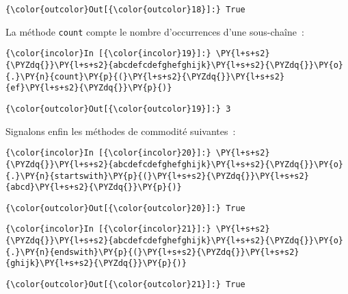 \begin{Verbatim}[commandchars=\\\{\}]
{\color{outcolor}Out[{\color{outcolor}18}]:} True
\end{Verbatim}
            
    La méthode \texttt{count} compte le nombre d'occurrences d'une
sous-chaîne~:

    \begin{Verbatim}[commandchars=\\\{\}]
{\color{incolor}In [{\color{incolor}19}]:} \PY{l+s+s2}{\PYZdq{}}\PY{l+s+s2}{abcdefcdefghefghijk}\PY{l+s+s2}{\PYZdq{}}\PY{o}{.}\PY{n}{count}\PY{p}{(}\PY{l+s+s2}{\PYZdq{}}\PY{l+s+s2}{ef}\PY{l+s+s2}{\PYZdq{}}\PY{p}{)}
\end{Verbatim}


\begin{Verbatim}[commandchars=\\\{\}]
{\color{outcolor}Out[{\color{outcolor}19}]:} 3
\end{Verbatim}
            
    Signalons enfin les méthodes de commodité suivantes~:

    \begin{Verbatim}[commandchars=\\\{\}]
{\color{incolor}In [{\color{incolor}20}]:} \PY{l+s+s2}{\PYZdq{}}\PY{l+s+s2}{abcdefcdefghefghijk}\PY{l+s+s2}{\PYZdq{}}\PY{o}{.}\PY{n}{startswith}\PY{p}{(}\PY{l+s+s2}{\PYZdq{}}\PY{l+s+s2}{abcd}\PY{l+s+s2}{\PYZdq{}}\PY{p}{)}
\end{Verbatim}


\begin{Verbatim}[commandchars=\\\{\}]
{\color{outcolor}Out[{\color{outcolor}20}]:} True
\end{Verbatim}
            
    \begin{Verbatim}[commandchars=\\\{\}]
{\color{incolor}In [{\color{incolor}21}]:} \PY{l+s+s2}{\PYZdq{}}\PY{l+s+s2}{abcdefcdefghefghijk}\PY{l+s+s2}{\PYZdq{}}\PY{o}{.}\PY{n}{endswith}\PY{p}{(}\PY{l+s+s2}{\PYZdq{}}\PY{l+s+s2}{ghijk}\PY{l+s+s2}{\PYZdq{}}\PY{p}{)}
\end{Verbatim}


\begin{Verbatim}[commandchars=\\\{\}]
{\color{outcolor}Out[{\color{outcolor}21}]:} True
\end{Verbatim}
            
